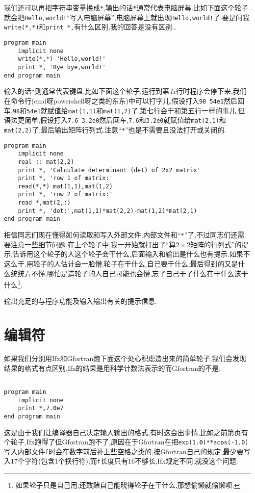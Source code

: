 我们还可以再把字符串变量换成\texttt{*},输出的话\texttt{*}通常代表电脑屏幕.比如下面这个轮子就会把\texttt{Hello,world!}``写入电脑屏幕'',电脑屏幕上就出现\texttt{Hello,world!}了.要是问我\texttt{write(*,*)}和\texttt{print *,}有什么区别,我的回答是没有区别\dots
\begin{lstlisting}
program main
    implicit none
    write(*,*) 'Hello,world!'
    print *, 'Bye bye,world!'
end program main
\end{lstlisting}
输入的话\texttt{*}则通常代表键盘.比如下面这个轮子,运行到第五行时程序会停下来,我们在命令行(cmd呀powershell呀之类的东东)中可以打字儿,假设打入\texttt{98 54e1}然后回车,\texttt{98}和\texttt{54e1}就赋值给\texttt{mat(1,1)}和\texttt{mat(1,2)}了,第七行会干和第五行一样的事儿,但语法更简单,假设打入\texttt{7.6 3.2e0}然后回车,\texttt{7.6}和\texttt{3.2e0}就赋值给\texttt{mat(2,1)}和\texttt{mat(2,2)}了,最后输出矩阵行列式.注意``\texttt{*}''也是不需要且没法打开或关闭的.
\begin{lstlisting}
program main
    implicit none
    real :: mat(2,2)
    print *, 'Calculate determinant (det) of 2x2 matrix'
    print *, 'row 1 of matrix:'
    read(*,*) mat(1,1),mat(1,2)
    print *, 'row 2 of matrix:'
    read *,mat(2,:)
    print *, 'det:',mat(1,1)*mat(2,2)-mat(1,2)*mat(2,1)
end program main
\end{lstlisting}

相信同志们现在懂得如何读取和写入外部文件,内部文件和``\texttt{*}''了,不过同志们还需要注意一些细节问题.在上个轮子中,我一开始就打出了``算$2\times2$矩阵的行列式''的提示,告诉用这个轮子的人这个轮子会干什么,后面输入和输出是什么也有提示.如果不这么干,用轮子的人估计会一脸懵,轮子在干什么,自己要干什么,最后得到的又是什么统统弄不懂,哪怕是造轮子的人自己可能也会懵,忘了自己干了什么在干什么该干什么\footnote{如果轮子只是自己用,还敢赌自己能晓得轮子在干什么,那想偷懒就偷懒呗.}.

\begin{convention}
    输出充足的与程序功能及输入输出有关的提示信息.
\end{convention}

\section{编辑符}\label{fortran_edit_descriptor}

如果我们分别用Ifx和Gfortran跑下面这个处心积虑造出来的简单轮子,我们会发现结果的格式有点区别,Ifx的结果是用科学计数法表示的而Gfortran的不是.
\begin{lstlisting}

program main
    implicit none
    print *,7.0e7
end program main
\end{lstlisting}
这是由于我们让编译器自己决定输入输出的格式,有时这会出事情,比如之前第\pageref{internal_file}页有个轮子,Ifx跑得了但Gfortran跑不了,原因在于Gfortran在把\texttt{exp(1.0)**acos(-1.0)}写入内部文件\texttt{f}时会在数字前后补上些空格之类的,按Gfortran自己的规定,最少要写入17个字符(包含1个换行符),而\texttt{f}长度只有16不够长,Ifx规定不同,就没这个问题.

